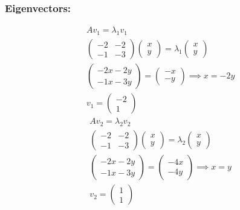 \documentclass[fleqn]{article}
\begin{document}
\subsubsection*{Eigenvectors: }
\begin{equation*}
    \begin{split}
    &Av_1=\lambda_1 v_1\\
    &\begin{pmatrix}-2&-2\\-1&-3\end{pmatrix}\begin{pmatrix}x\\y\end{pmatrix}=\lambda_1\begin{pmatrix}x\\y\end{pmatrix}\\
    &\begin{pmatrix}-2x-2y\\-1x-3y\end{pmatrix}=\begin{pmatrix}-x\\-y\end{pmatrix} \implies x= -2y\\
    &v_1=\begin{pmatrix}-2\\1\end{pmatrix}
    \end{split}
\end{equation*}
\begin{equation*}
    \begin{split}
    &Av_2=\lambda_2 v_2\\
    &\begin{pmatrix}-2&-2\\-1&-3\end{pmatrix}\begin{pmatrix}x\\y\end{pmatrix}=\lambda_2\begin{pmatrix}x\\y\end{pmatrix}\\
    &\begin{pmatrix}-2x-2y\\-1x-3y\end{pmatrix}=\begin{pmatrix}-4x\\-4y\end{pmatrix} \implies x=y\\
    &v_2=\begin{pmatrix}1\\1\end{pmatrix}
    \end{split}
\end{equation*}
\pagebreak
\end{document}
